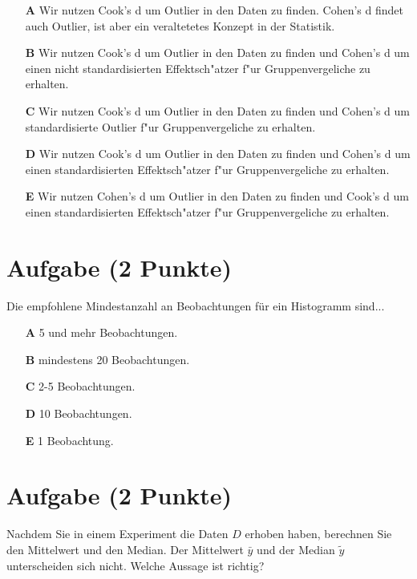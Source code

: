\documentclass[a4paper, 10pt]{scrartcl}\usepackage[]{graphicx}\usepackage[]{xcolor}
\begin{document}
\begin{enumerate}
\item [\textbf{A} \msquare] Wir nutzen Cook's d um Outlier in den Daten zu finden. Cohen's d findet auch Outlier, ist aber ein veraltetetes Konzept in der Statistik.
\item [\textbf{B} \msquare] Wir nutzen Cook's d um Outlier in den Daten zu finden und Cohen's d um einen nicht standardisierten Effektsch{"a}tzer f{"u}r Gruppenvergeliche zu erhalten.
\item [\textbf{C} \msquare] Wir nutzen Cook's d um Outlier in den Daten zu finden und Cohen's d um standardisierte Outlier f{"u}r Gruppenvergeliche zu erhalten.
\item [\textbf{D} \msquare] Wir nutzen Cook's d um Outlier in den Daten zu finden und Cohen's d um einen standardisierten Effektsch{"a}tzer f{"u}r Gruppenvergeliche zu erhalten.
\item [\textbf{E} \msquare] Wir nutzen Cohen's d um Outlier in den Daten zu finden und Cook's d um einen standardisierten Effektsch{"a}tzer f{"u}r Gruppenvergeliche zu erhalten.
\end{enumerate}

\section{Aufgabe \hfill (2 Punkte)}



Die empfohlene Mindestanzahl an Beobachtungen f{\"u}r ein Histogramm sind...



\begin{enumerate}
\item [\textbf{A} \msquare] 5 und mehr Beobachtungen.
\item [\textbf{B} \msquare] mindestens 20 Beobachtungen.
\item [\textbf{C} \msquare] 2-5 Beobachtungen.
\item [\textbf{D} \msquare] 10 Beobachtungen.
\item [\textbf{E} \msquare] 1 Beobachtung.
\end{enumerate} 

\section{Aufgabe \hfill (2 Punkte)}



Nachdem Sie in einem Experiment die Daten $D$ erhoben haben, berechnen Sie den
Mittelwert und den Median. Der Mittelwert $\bar{y}$ und der Median
$\tilde{y}$ unterscheiden sich nicht. Welche Aussage ist richtig?
\end{document}
